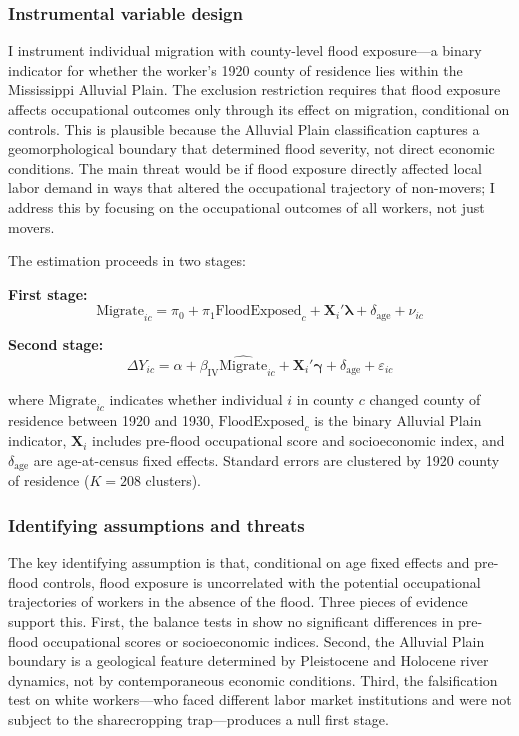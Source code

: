 \documentclass[12pt]{article}
\begin{document}
\subsubsection*{Instrumental variable design} I instrument individual migration with county-level flood exposure---a binary indicator for whether the worker's 1920 county of residence lies within the Mississippi Alluvial Plain. The exclusion restriction requires that flood exposure affects occupational outcomes only through its effect on migration, conditional on controls. This is plausible because the Alluvial Plain classification captures a geomorphological boundary that determined flood severity, not direct economic conditions. The main threat would be if flood exposure directly affected local labor demand in ways that altered the occupational trajectory of non-movers; I address this by focusing on the occupational outcomes of all workers, not just movers.

The estimation proceeds in two stages:

\noindent\textbf{First stage:}
\begin{equation}
\text{Migrate}_{ic} = \pi_0 + \pi_1 \text{FloodExposed}_c + \mathbf{X}_i'\boldsymbol{\lambda} + \delta_{\text{age}} + \nu_{ic}
\label{eq:first_stage}
\end{equation}

\noindent\textbf{Second stage:}
\begin{equation}
\Delta Y_{ic} = \alpha + \beta_{\text{IV}} \widehat{\text{Migrate}}_{ic} + \mathbf{X}_i'\boldsymbol{\gamma} + \delta_{\text{age}} + \varepsilon_{ic}
\label{eq:second_stage}
\end{equation}

\noindent where $\text{Migrate}_{ic}$ indicates whether individual $i$ in county $c$ changed county of residence between 1920 and 1930, $\text{FloodExposed}_c$ is the binary Alluvial Plain indicator, $\mathbf{X}_i$ includes pre-flood occupational score and socioeconomic index, and $\delta_{\text{age}}$ are age-at-census fixed effects. Standard errors are clustered by 1920 county of residence ($K = 208$ clusters).

\subsubsection*{Identifying assumptions and threats} The key identifying assumption is that, conditional on age fixed effects and pre-flood controls, flood exposure is uncorrelated with the potential occupational trajectories of workers in the absence of the flood. Three pieces of evidence support this. First, the balance tests in  show no significant differences in pre-flood occupational scores or socioeconomic indices. Second, the Alluvial Plain boundary is a geological feature determined by Pleistocene and Holocene river dynamics, not by contemporaneous economic conditions. Third, the falsification test on white workers---who faced different labor market institutions and were not subject to the sharecropping trap---produces a null first stage.
\end{document}
